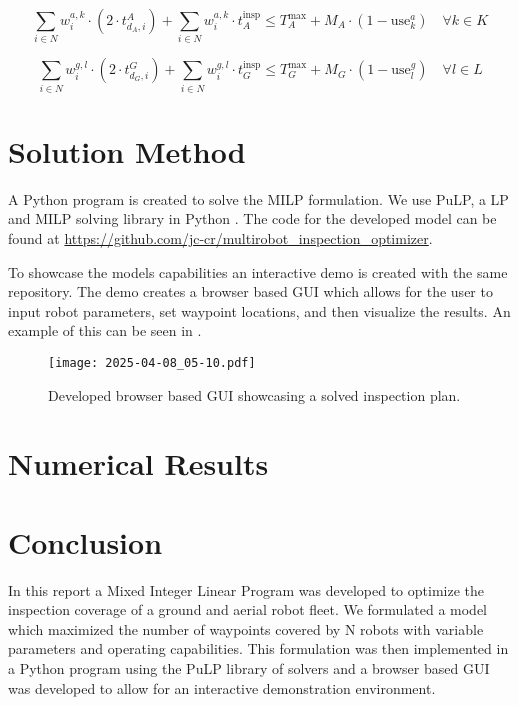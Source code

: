 \documentclass{article}
\begin{document}
				\begin{equation}
					\sum_{i \in N} w_i^{a,k} \cdot \left( 2 \cdot t_{d_A,i}^{A}\right) + \sum_{i \in N} w_i^{a,k} \cdot t_A^{\text{insp}} \leq T_A^{\max} + M_A \cdot (1 - \text{use}_k^a) \quad \forall k \in K
				\end{equation}


				\begin{equation}
					\sum_{i \in N} w_i^{g,l} \cdot \left( 2 \cdot t_{d_G,i}^{G}\right) + \sum_{i \in N} w_i^{g,l} \cdot t_G^{\text{insp}} \leq T_G^{\max} + M_G \cdot (1 - \text{use}_l^g) \quad \forall l \in L
				\end{equation}


	\section{Solution Method}\label{sol_methods}

		A Python program is created to solve the MILP formulation. 
		We use PuLP, a LP and MILP solving library in Python \cite{pulp}.
		The code for the developed model can be found at \url{https://github.com/jc-cr/multirobot_inspection_optimizer}.

		To showcase the models capabilities an interactive demo is created with the same repository. 
		The demo creates a browser based GUI which allows for the user to input robot parameters, set waypoint locations, and then visualize the results.
		An example of this can be seen in .

		\begin{figure}[htbp]
			\centering
			\texttt{[image: 2025-04-08\_05-10.pdf]}
			\caption{Developed browser based GUI showcasing a solved inspection plan.}
			\label{fig:demo}
		\end{figure}


	\section{Numerical Results}\label{numerical_results}




	\section{Conclusion}\label{conclusion}

	In this report a Mixed Integer Linear Program was developed to optimize the inspection coverage of a ground and aerial robot fleet. 
	We formulated a model which maximized the number of waypoints covered by N robots with variable parameters and operating capabilities.
	This formulation was then implemented in a Python program using the PuLP library of solvers and a browser based GUI was developed to allow for an interactive demonstration environment.

	\newpage
	
	\nocite{*}
	
\end{document}
